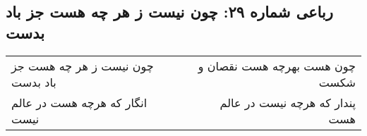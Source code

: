 \begin{center}
\section*{رباعی شماره ۲۹: چون نیست ز هر چه هست جز باد بدست}
\label{sec:sh029}
\begin{longtable}{l p{0.5cm} r}
چون نیست ز هر چه هست جز باد بدست
&&
چون هست بهرچه هست نقصان و شکست
\\
انگار که هرچه هست در عالم نیست
&&
پندار که هرچه نیست در عالم هست
\\
\end{longtable}
\end{center}
